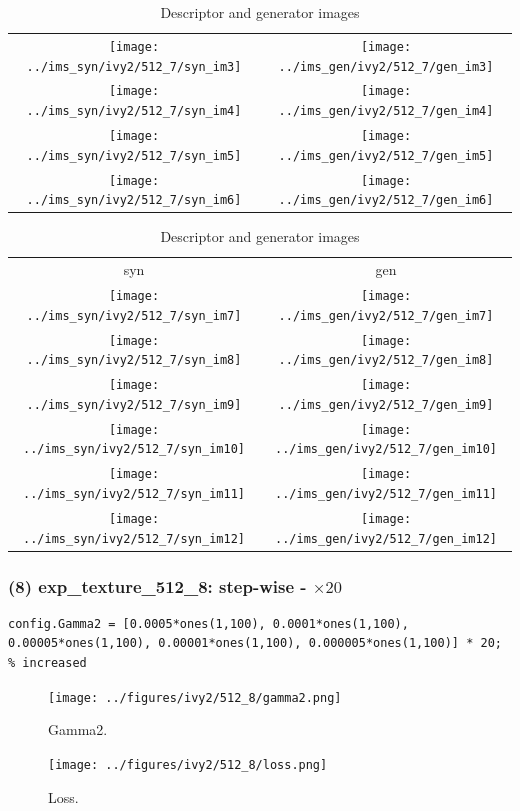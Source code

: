 \documentclass[letter]{article}
\begin{document}
\begin{table}[h!]
\begin{tabular}{cc}
		\texttt{[image: ../ims\_syn/ivy2/512\_7/syn\_im3]} & \texttt{[image: ../ims\_gen/ivy2/512\_7/gen\_im3]} \tabularnewline
		\texttt{[image: ../ims\_syn/ivy2/512\_7/syn\_im4]} & \texttt{[image: ../ims\_gen/ivy2/512\_7/gen\_im4]} \tabularnewline
		\texttt{[image: ../ims\_syn/ivy2/512\_7/syn\_im5]} & \texttt{[image: ../ims\_gen/ivy2/512\_7/gen\_im5]} \tabularnewline
		\texttt{[image: ../ims\_syn/ivy2/512\_7/syn\_im6]} & \texttt{[image: ../ims\_gen/ivy2/512\_7/gen\_im6]} \tabularnewline
	\end{tabular}
	\begin{tabular}{cc}
		syn & gen\tabularnewline
		\texttt{[image: ../ims\_syn/ivy2/512\_7/syn\_im7]} & \texttt{[image: ../ims\_gen/ivy2/512\_7/gen\_im7]} \tabularnewline
		\texttt{[image: ../ims\_syn/ivy2/512\_7/syn\_im8]} & \texttt{[image: ../ims\_gen/ivy2/512\_7/gen\_im8]} \tabularnewline
		\texttt{[image: ../ims\_syn/ivy2/512\_7/syn\_im9]} & \texttt{[image: ../ims\_gen/ivy2/512\_7/gen\_im9]} \tabularnewline
		\texttt{[image: ../ims\_syn/ivy2/512\_7/syn\_im10]} & \texttt{[image: ../ims\_gen/ivy2/512\_7/gen\_im10]} \tabularnewline
		\texttt{[image: ../ims\_syn/ivy2/512\_7/syn\_im11]} & \texttt{[image: ../ims\_gen/ivy2/512\_7/gen\_im11]} \tabularnewline
		\texttt{[image: ../ims\_syn/ivy2/512\_7/syn\_im12]} & \texttt{[image: ../ims\_gen/ivy2/512\_7/gen\_im12]} \tabularnewline
	\end{tabular}
	\caption{Descriptor and generator images}
\end{table}
\newpage

\subsubsection*{(8) exp\_texture\_512\_8: step-wise - $\times20$}

\begin{lstlisting}
config.Gamma2 = [0.0005*ones(1,100), 0.0001*ones(1,100), 0.00005*ones(1,100), 0.00001*ones(1,100), 0.000005*ones(1,100)] * 20; % increased 
\end{lstlisting}

\begin{figure}[h!]
	\centering
	\texttt{[image: ../figures/ivy2/512\_8/gamma2.png]}
	\caption{\label{fig:gamma1}Gamma2.}
\end{figure}

\begin{figure}[h!]
	\centering
	\texttt{[image: ../figures/ivy2/512\_8/loss.png]}
	\caption{\label{fig:gamma1}Loss.}
\end{figure}
\end{document}
